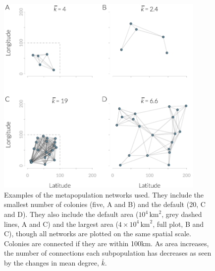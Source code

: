 







\begin{knitrout}\footnotesize
{}\color{fgcolor}\begin{figure}[t]

{\centering \includegraphics[width=0.9\textwidth]{figure/colonyNetworkPlots-1} 

}

\caption[Example metapopulation networks]{
Examples of the metapopulation networks used.
They include the smallest number of colonies (five, A and B) and the default (20, C and D).
They also include the default area ($10^4\,\text{km}^2$, grey dashed lines, A and C) and the largest area ($4\times10^4\,\text{km}^2$, full plot, B and C), though all networks are plotted on the same spatial scale.
Colonies are connected if they are within 100km.
As area increases, the number of connections each subpopulation has decreases as seen by the changes in mean degree, $\bar{k}$.
}\label{fig:colonyNetworkPlots}
\end{figure}


\end{knitrout}











